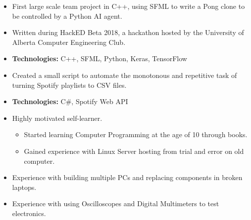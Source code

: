 \documentclass[10pt,a4paper,ragged2e]{altacv}
\begin{document}
\begin{itemize}
  \item First large scale team project in C++, using SFML to write a Pong clone to be controlled by a Python AI agent.
  \item Written during HackED Beta 2018, a hackathon hosted by the University of Alberta Computer Engineering Club.
  \item \textbf{Technologies:} C++, SFML, Python, Keras, TensorFlow
\end{itemize}
\divider\small

\begin{itemize}
  \item Created a small script to automate the monotonous and repetitive task of turning Spotify playlists to CSV files.
  \item \textbf{Technologies:} C\#, Spotify Web API
\end{itemize}
\divider\small

\begin{itemize}
  \item Highly motivated self-learner.
        \begin{itemize}
          \item Started learning Computer Programming at the age of 10 through books.
          \item Gained experience with Linux Server hosting from trial and error on old computer.
        \end{itemize}
  \item Experience with building multiple PCs and replacing components in broken laptops.
  \item Experience with using Oscilloscopes and Digital Multimeters to test electronics.

\end{itemize}

\clearpage
\nocite{*}
\end{document}
